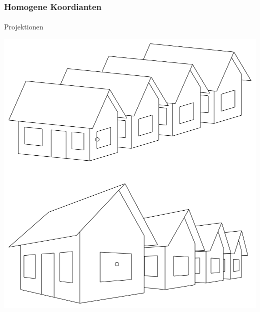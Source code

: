 \documentclass{beamer}
\begin{document}
\begin{frame}
    \frametitle{Homogene Koordianten}
\framesubtitle{}
    \begin{block}{Projektionen}
\begin{center}
\includegraphics[scale=0.15]{images/projs}
\end{center}
\end{block}

\end{frame}
\end{document}
